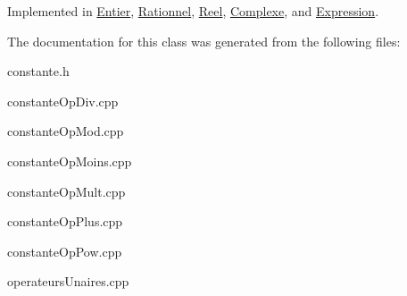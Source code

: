Implemented in \hyperlink{class_entier_a349675638599cd6e5f67161664e1d58a}{Entier}, \hyperlink{class_rationnel_a2403f411e88b3de9f83ad735342e68ec}{Rationnel}, \hyperlink{class_reel_ab66ca2cb446b1cbc0c3565ff054acc1b}{Reel}, \hyperlink{class_complexe_acfe2a56e2024db9eca2039fccdb2d6f4}{Complexe}, and \hyperlink{class_expression_ad602729011040226673d7c1ee94367d9}{Expression}.



The documentation for this class was generated from the following files\-:\begin{DoxyCompactItemize}
\item 
constante.\-h\item 
constante\-Op\-Div.\-cpp\item 
constante\-Op\-Mod.\-cpp\item 
constante\-Op\-Moins.\-cpp\item 
constante\-Op\-Mult.\-cpp\item 
constante\-Op\-Plus.\-cpp\item 
constante\-Op\-Pow.\-cpp\item 
operateurs\-Unaires.\-cpp\end{DoxyCompactItemize}
